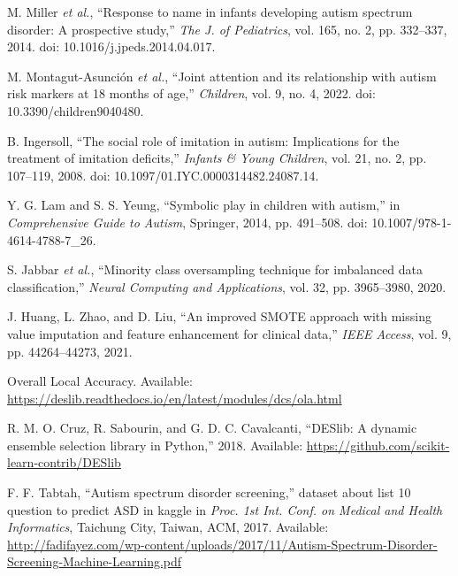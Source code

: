 \documentclass[conference]{IEEEtran}
\begin{document}
\begin{thebibliography}{99}
 M. Miller \textit{et al.}, ``Response to name in infants developing autism spectrum disorder: A prospective study,'' \textit{The J. of Pediatrics}, vol. 165, no. 2, pp. 332--337, 2014. doi: 10.1016/j.jpeds.2014.04.017.

 M. Montagut-Asunción \textit{et al.}, ``Joint attention and its relationship with autism risk markers at 18 months of age,'' \textit{Children}, vol. 9, no. 4, 2022. doi: 10.3390/children9040480.

 B. Ingersoll, ``The social role of imitation in autism: Implications for the treatment of imitation deficits,'' \textit{Infants \& Young Children}, vol. 21, no. 2, pp. 107--119, 2008. doi: 10.1097/01.IYC.0000314482.24087.14.

 Y. G. Lam and S. S. Yeung, ``Symbolic play in children with autism,'' in \textit{Comprehensive Guide to Autism}, Springer, 2014, pp. 491--508. doi: 10.1007/978-1-4614-4788-7\_26.

 S. Jabbar \textit{et al.}, ``Minority class oversampling technique for imbalanced data classification,'' \textit{Neural Computing and Applications}, vol. 32, pp. 3965--3980, 2020.

 J. Huang, L. Zhao, and D. Liu, ``An improved SMOTE approach with missing value imputation and feature enhancement for clinical data,'' \textit{IEEE Access}, vol. 9, pp. 44264--44273, 2021.

 Overall Local Accuracy. Available: \url{https://deslib.readthedocs.io/en/latest/modules/dcs/ola.html}

 R. M. O. Cruz, R. Sabourin, and G. D. C. Cavalcanti, ``DESlib: A dynamic ensemble selection library in Python,'' 2018. Available: \url{https://github.com/scikit-learn-contrib/DESlib}

 F. F. Tabtah, ``Autism spectrum disorder screening,'' dataset about list 10 question to predict ASD in kaggle in \textit{Proc. 1st Int. Conf. on Medical and Health Informatics}, Taichung City, Taiwan, ACM, 2017. Available: \url{http://fadifayez.com/wp-content/uploads/2017/11/Autism-Spectrum-Disorder-Screening-Machine-Learning.pdf}

\end{thebibliography}
\end{document}
